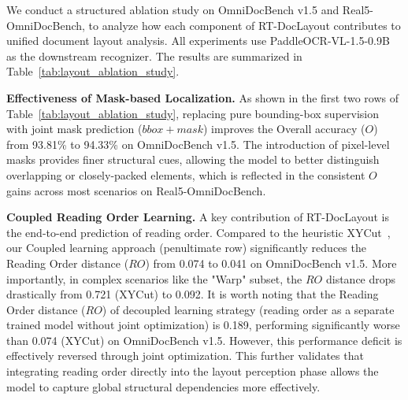 \documentclass[11pt, a4paper,logo,  copyright, nonumbering]{paddleocr}
\begin{document}
We conduct a structured ablation study on OmniDocBench v1.5 and Real5-OmniDocBench, to analyze how each component of RT-DocLayout contributes to unified document layout analysis. All experiments use PaddleOCR-VL-1.5-0.9B as the downstream recognizer. The results are summarized in Table~\ref{tab:layout_ablation_study}.

\textbf{Effectiveness of Mask-based Localization.}
As shown in the first two rows of Table~\ref{tab:layout_ablation_study}, replacing pure bounding-box supervision with joint mask prediction ($bbox+mask$) improves the Overall accuracy ($O$) from 93.81\% to 94.33\% on OmniDocBench v1.5. The introduction of pixel-level masks provides finer structural cues, allowing the model to better distinguish overlapping or closely-packed elements, which is reflected in the consistent $O$ gains across most scenarios on Real5-OmniDocBench.


\textbf{Coupled Reading Order Learning.}
A key contribution of RT-DocLayout is the end-to-end prediction of reading order. Compared to the heuristic XYCut~\cite{ha1995recursive}, our Coupled learning approach (penultimate row) significantly reduces the Reading Order distance ($RO$) from 0.074 to 0.041 on OmniDocBench v1.5. More importantly, in complex scenarios like the "Warp" subset, the $RO$ distance drops drastically from 0.721 (XYCut) to 0.092. It is worth noting that the Reading Order distance ($RO$) of decoupled learning strategy (reading order as a separate trained model without joint optimization) is 0.189, performing significantly worse than 0.074 (XYCut) on OmniDocBench v1.5. However, this performance deficit is effectively reversed through joint optimization. This further validates that integrating reading order directly into the layout perception phase allows the model to capture global structural dependencies more effectively.
\end{document}
